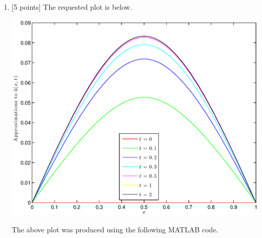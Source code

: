 \begin{solution}
\begin{enumerate}
\item {[5 points]} The requested plot is below.

\begin{center}\includegraphics[scale=0.7]{hw38b.eps}\end{center}

The above plot was produced using the following MATLAB code.




\end{enumerate}
\end{solution}
